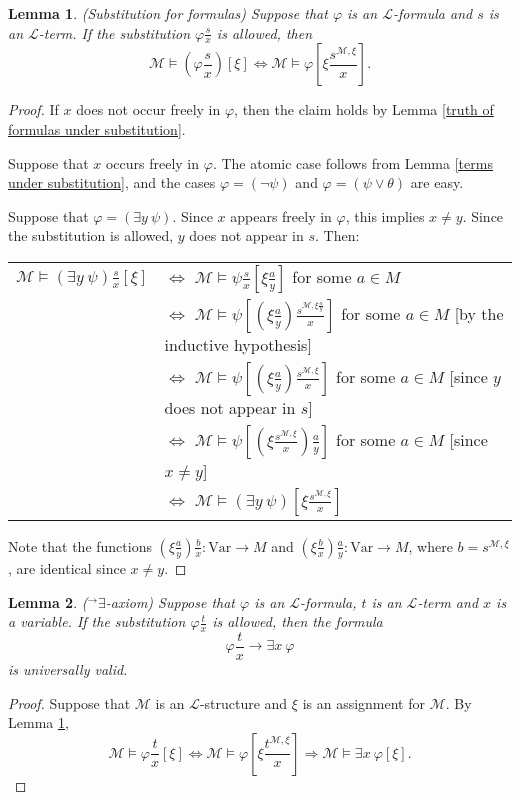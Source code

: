 \documentclass[a4paper, 11pt]{amsart}
\newtheorem{lemma}[lemma]{Lemma}
\theoremstyle{remark}
\newcommand{\cL}{\mathcal L}
\newcommand{\cM}{\mathcal M}
\newcommand{\Var}{\mathrm{Var}}
\begin{document}


\begin{lemma}(Substitution for formulas) 
\label{substitution for formulas} 
Suppose that $\varphi$ is an $\cL$-formula and $s$ is an $\cL$-term. 
\label{substitution for formulas} 
If the substitution $ \varphi \frac{s}{x}$ is allowed, then 
$$ \cM \models (\varphi\frac{s}{x})[\xi] \Longleftrightarrow \cM \models \varphi [\xi \frac{s^{\cM,\xi}}{x}].$$ 
\end{lemma} 
\begin{proof} 
If $x$ does not occur freely in $\varphi$, then the claim holds by Lemma \ref{truth of formulas under substitution}. 

Suppose that $x$ occurs freely in $\varphi$. 
The atomic case follows from Lemma \ref{terms under substitution}, and the cases $\varphi=(\neg \psi)$ and $\varphi=(\psi \vee \theta)$ are easy. 

Suppose that $\varphi=(\exists y\ \psi)$. 
Since $x$ appears freely in $\varphi$, this implies $x\neq y$. 
Since the substitution is allowed, $y$ does not appear in $s$.
Then: 

\begin{tabular}{ll} 
$\cM \models (\exists y\ \psi)\frac{s}{x}[\xi]$ & $\Longleftrightarrow$ $\cM \models \psi\frac{s}{x}[\xi\frac{a}{y}]$ for some $a\in M$ \\ 
& $\Longleftrightarrow$ $\cM \models \psi[(\xi \frac{a}{y}) \frac{s^{\cM,\xi\frac{a}{y}}}{x}]$ for some $a\in M$ [by the inductive hypothesis] \\ 
& $\Longleftrightarrow$ $\cM \models \psi[(\xi \frac{a}{y}) \frac{s^{\cM,\xi}}{x}]$ for some $a\in M$ [since $y$ does not appear in $s$] \\ 
& $\Longleftrightarrow$ $\cM \models \psi[(\xi \frac{s^{\cM,\xi}}{x})\frac{a}{y}]$ for some $a\in M$ [since $x\neq y$] \\ 
& $\Longleftrightarrow$ $\cM \models (\exists y\ \psi) [\xi \frac{s^{\cM,\xi}}{x}]$
\end{tabular} 
Note that the functions $(\xi \frac{a}{y}) \frac{b}{x} \colon \Var\rightarrow M$ and $(\xi \frac{b}{x})\frac{a}{y}\colon \Var\rightarrow M$, where $b=s^{\cM,\xi}$, are identical since $x\neq y$. 
\end{proof} 




\begin{lemma}(${}^\rightarrow\exists$-axiom) 
Suppose that $\varphi$ is an $\cL$-formula, $t$ is an $\cL$-term and $x$ is a variable.
 If the substitution $ \varphi \frac{t}{x}$ is allowed, then the formula 
$$ \varphi \frac{t}{x} \rightarrow \exists x\ \varphi$$ 
is universally valid. 
\end{lemma} 
\begin{proof} 
Suppose that $\cM$ is an $\cL$-structure and $\xi$ is an assignment for $\cM$. 
By Lemma \ref{substitution for formulas}, 
$$ \cM \models \varphi \frac{t}{x}[\xi] \Longleftrightarrow \cM \models \varphi[\xi \frac{t^{\cM,\xi}}{x}] \Longrightarrow \cM \models \exists x\ \varphi[\xi].$$ 
\end{proof} 
\end{document}

